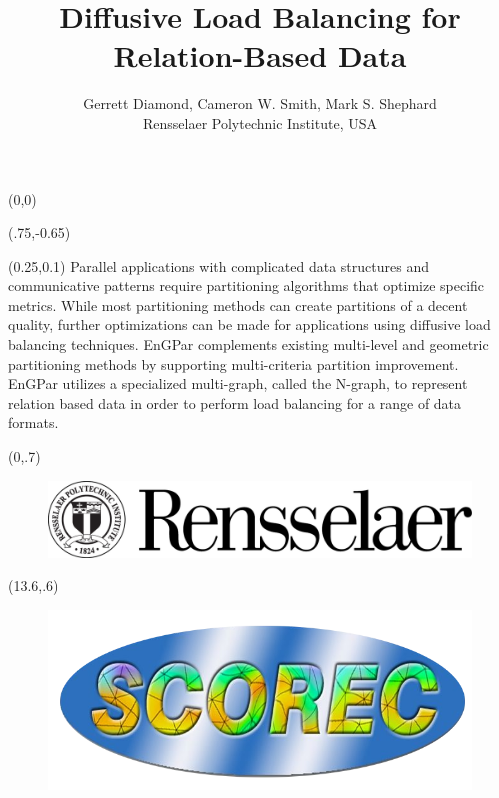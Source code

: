 \documentclass{beamer}
\begin{document}
\title[]
{\bf \fontsize{100}{110}\selectfont
Diffusive Load Balancing for Relation-Based Data
}
\author[]{\fontsize{50}{60}\selectfont
  Gerrett Diamond, Cameron W. Smith, Mark S. Shephard\\
  Rensselaer Polytechnic Institute, USA}
\date{}
\begin{textblock}{15.6}(0,0)
  \titlepage
  \begin{textblock}{14.5}(.75,-0.65)
    \begin{block}{}
      \begin{textblock}{14}(0.25,0.1)
        \centering
        \justify
          \fontsize{37}{43}\selectfont
      Parallel applications with complicated data structures and communicative patterns
      require partitioning algorithms that optimize specific metrics. While most
      partitioning methods can create partitions of a decent quality, further
      optimizations can be made for applications using diffusive load balancing techniques.
      EnGPar complements existing multi-level and geometric partitioning methods by supporting
      multi-criteria partition improvement. EnGPar utilizes a specialized multi-graph, called
      the N-graph, to represent relation based data in order to perform load balancing for a
      range of data formats.
      \end{textblock}
      \vspace{5cm}
    \end{block}
  \end{textblock}
\end{textblock}
\begin{textblock}{4}(0,.7)
  \begin{figure}
    \includegraphics[width=\textwidth]{../logos/RPI.png}
  \end{figure}

\end{textblock}
\begin{textblock}{2}(13.6,.6)
  \begin{figure}
    \includegraphics[width=\textwidth]{../logos/SCOREC_backgroundless.png}
  \end{figure}

\end{textblock}
\end{document}
